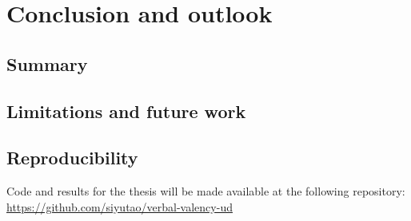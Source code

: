 \chapter{Conclusion and outlook}\label{chapter:conclusion}
\section{Summary}

\section{Limitations and future work}

\section{Reproducibility}
Code and results for the thesis will be made available at the following repository: \url{https://github.com/siyutao/verbal-valency-ud}
